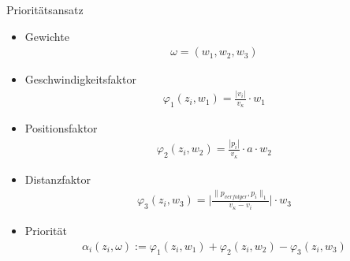 \documentclass[10pt,table,xcolor=dvipsnames]{beamer}
\begin{document}

\begin{frame}{Prioritätsansatz}
\small
\begin{itemize}
\item 
Gewichte
\begin{align*}
\omega = (w_1, w_2 ,w_3)
\end{align*}\pause
\item
Geschwindigkeitsfaktor
\begin{align*}
\varphi_1(z_i, w_1) = \frac{|v_i|}{v_{\kappa}}\cdot w_1
\end{align*}\pause
\item
Positionsfaktor
\begin{align*}
\varphi_2(z_i, w_2) = \frac{|p_i|}{v_{\kappa}}\cdot a \cdot w_2
\end{align*}\pause
\item
Distanzfaktor
\begin{align*}
\varphi_3(z_i, w_3) = \bigg\vert\frac{\|p_{verfolger},p_i\|_1}{v_{\kappa}-v_i}\bigg\vert \cdot w_3
\end{align*}\pause
\item
Priorität
\begin{align*}
\alpha_i(z_i, \omega) := \varphi_1(z_i,w_1) + \varphi_2(z_i,w_2) - \varphi_3(z_i,w_3)
\end{align*}
\end{itemize}
\normalsize
\end{frame}
\end{document}

